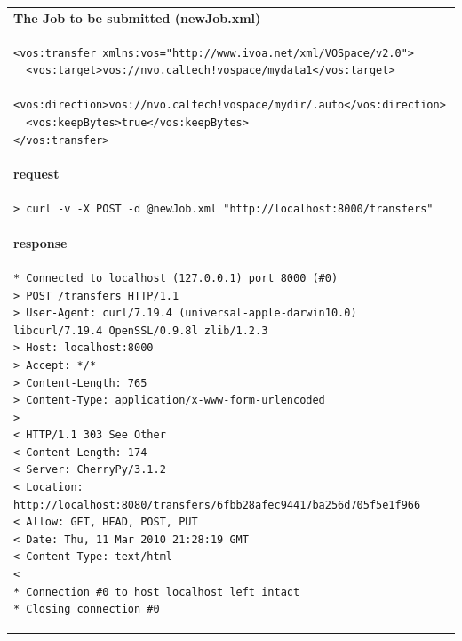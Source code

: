 \documentclass[11pt,a4paper]{ivoa}
\begin{document}
\begin{tabular}{ p{10cm} }
\\
\textbf{The Job to be submitted (newJob.xml)} \\
\begin{lstlisting}
<vos:transfer xmlns:vos="http://www.ivoa.net/xml/VOSpace/v2.0">
  <vos:target>vos://nvo.caltech!vospace/mydata1</vos:target>
  <vos:direction>vos://nvo.caltech!vospace/mydir/.auto</vos:direction>
  <vos:keepBytes>true</vos:keepBytes>
</vos:transfer>
\end{lstlisting} \\
\textbf{request} \\
\begin{lstlisting}
> curl -v -X POST -d @newJob.xml "http://localhost:8000/transfers"
\end{lstlisting} \\
\textbf{response} \\
\begin{lstlisting}
* Connected to localhost (127.0.0.1) port 8000 (#0)
> POST /transfers HTTP/1.1
> User-Agent: curl/7.19.4 (universal-apple-darwin10.0) libcurl/7.19.4 OpenSSL/0.9.8l zlib/1.2.3
> Host: localhost:8000
> Accept: */*
> Content-Length: 765
> Content-Type: application/x-www-form-urlencoded
> 
< HTTP/1.1 303 See Other
< Content-Length: 174
< Server: CherryPy/3.1.2
< Location: http://localhost:8080/transfers/6fbb28afec94417ba256d705f5e1f966
< Allow: GET, HEAD, POST, PUT
< Date: Thu, 11 Mar 2010 21:28:19 GMT
< Content-Type: text/html
< 
* Connection #0 to host localhost left intact
* Closing connection #0
\end{lstlisting} \\
\end{tabular}
\end{document}
